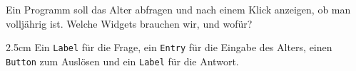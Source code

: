 \question[3]
Ein Programm soll das Alter abfragen und nach einem Klick anzeigen, ob man volljährig ist. Welche Widgets brauchen wir, und wofür?
\begin{solutionbox}{2.5cm}
Ein \texttt{Label} für die Frage, ein \texttt{Entry} für die Eingabe des Alters, einen \texttt{Button} zum Auslösen und ein \texttt{Label} für die Antwort.
\end{solutionbox}
